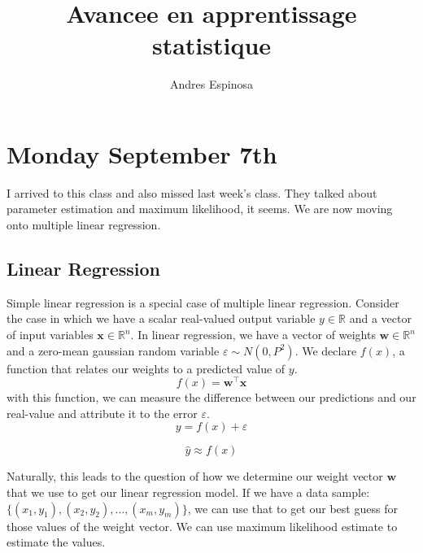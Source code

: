 \documentclass[11pt]{article}
\title{Avancee en apprentissage statistique}
\author{Andres Espinosa}
\begin{document}
\pgfplotsset{compat=1.18}
\maketitle

\tableofcontents
\section{Monday September 7th}
I arrived to this class and also missed last week's class.
They talked about parameter estimation and maximum likelihood, it seems.
We are now moving onto multiple linear regression.

\subsection{Linear Regression}
Simple linear regression is a special case of multiple linear regression.
Consider the case in which we have a scalar real-valued output variable $y \in \mathbb{R}$ and a vector of input variables $\textbf{x} \in \mathbb{R}^n$.
In linear regression, we have a vector of weights $\textbf{w} \in \mathbb{R}^n$ and a zero-mean gaussian random variable $\varepsilon \sim N(0,P^2)$.
We declare $f(x)$, a function that relates our weights to a predicted value of $y$.
\begin{equation}
  f(x) = \textbf{w}^\top \textbf{x}
\end{equation}
with this function, we can measure the difference between our predictions and our real-value and attribute it to the error $\varepsilon$.
\begin{equation}
  y = f(x) + \varepsilon
\end{equation}

\begin{equation}
  \hat{y} \approx f(x)
\end{equation}

Naturally, this leads to the question of how we determine our weight vector $\textbf{w}$ that we use to get our linear regression model.
If we have a data sample: $\{ (x_1, y_1), (x_2, y_2), \dots, (x_m, y_m)\}$, we can use that to get our best guess for those values of the weight vector.
We can use maximum likelihood estimate to estimate the values.
\end{document}
